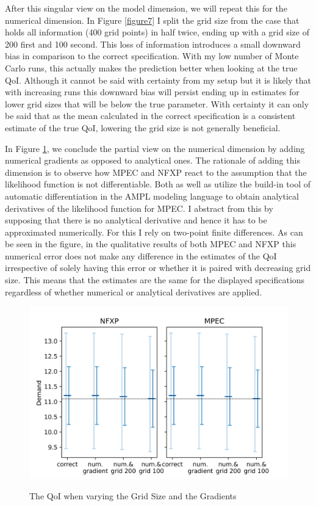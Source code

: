 After this singular view on the model dimension, we will repeat this for the numerical dimension. In Figure \ref{figure7} I split the grid size from the case that holds all information (400 grid points) in half twice, ending up with a grid size of 200 first and 100 second. This loss of information introduces a small downward bias in comparison to the correct specification. With my low number of Monte Carlo runs, this actually makes the prediction better when looking at the true QoI. Although it cannot be said with certainty from my setup but it is likely that with increasing runs this downward bias will persist ending up in estimates for lower grid sizes that will be below the true parameter. With certainty it can only be said that as the mean calculated in the correct specification is a consistent estimate of the true QoI, lowering the grid size is not generally beneficial.

In Figure \ref{figure8}, we conclude the partial view on the numerical dimension by adding numerical gradients as opposed to analytical ones. The rationale of adding this dimension is to observe how MPEC and NFXP react to the assumption that the likelihood function is not differentiable. Both \cite{Su.Judd.2012} as well as \cite{Iskhakov.2016} utilize the build-in tool of automatic differentiation in the AMPL modeling language to obtain analytical derivatives of the likelihood function for MPEC. I abstract from this by supposing that there is no analytical derivative and hence it has to be approximated numerically. For this I rely on two-point finite differences. As can be seen in the figure, in the qualitative results of both MPEC and NFXP this numerical error does not make any difference in the estimates of the QoI irrespective of solely having this error or whether it is paired with decreasing grid size. This means that the estimates are the same for the displayed specifications regardless of whether numerical or analytical derivatives are applied.

\begin{figure}[!t]
	\caption{The QoI when varying the Grid Size and the Gradients}
	\vspace*{-4mm}
	\centering
	\includegraphics[scale=0.9]{../figures/figure_8.png}
	\label{figure8}
\end{figure}

